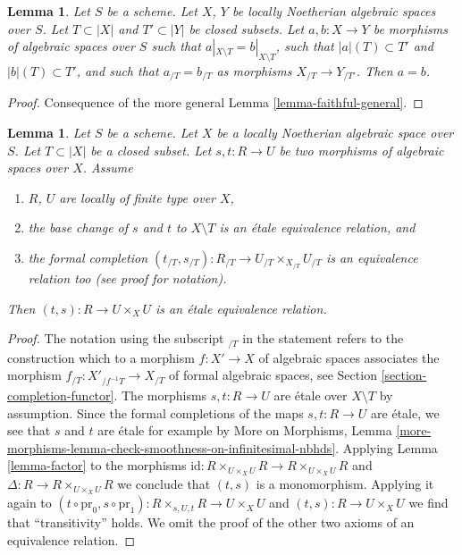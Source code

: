 \documentclass{stacks-project}
\theoremstyle{plain}
\newtheorem{lemma}[subsection]{Lemma}
\theoremstyle{definition}
\theoremstyle{remark}
\numberwithin{equation}{subsection}
\begin{document}
\begin{lemma}
\label{lemma-faithful}
Let $S$ be a scheme. Let $X$, $Y$ be locally Noetherian algebraic spaces
over $S$. Let $T \subset |X|$ and $T' \subset |Y|$ be closed subsets.
Let $a, b : X \to Y$ be morphisms of algebraic spaces over $S$ such
that $a|_{X \setminus T} = b|_{X \setminus T}$, such that
$|a|(T) \subset T'$ and $|b|(T) \subset T'$, and such that
$a_{/T} = b_{/T}$ as morphisms $X_{/T} \to Y_{/T'}$.
Then $a = b$.
\end{lemma}

\begin{proof}
Consequence of the more general Lemma \ref{lemma-faithful-general}.
\end{proof}

\begin{lemma}
\label{lemma-equivalence-relation}
Let $S$ be a scheme. Let $X$ be a locally Noetherian algebraic space
over $S$. Let $T \subset |X|$ be a closed subset.
Let $s, t : R \to U$ be two morphisms of algebraic spaces over $X$.
Assume
\begin{enumerate}
\item $R$, $U$ are locally of finite type over $X$,
\item the base change of $s$ and $t$ to $X \setminus T$
is an \'etale equivalence relation, and
\item the formal completion
$(t_{/T}, s_{/T}) : R_{/T} \to U_{/T} \times_{X_{/T}} U_{/T}$
is an equivalence relation too (see proof for notation).
\end{enumerate}
Then $(t, s) : R \to U \times_X U$ is an \'etale equivalence relation.
\end{lemma}

\begin{proof}
The notation using the subscript ${}_{/T}$ in the statement refers to the
construction which to a morphism $f : X' \to X$ of algebraic spaces
associates the morphism $f_{/T} : X'_{/f^{-1}T} \to X_{/T}$ of formal
algebraic spaces, see Section \ref{section-completion-functor}.
The morphisms $s, t : R \to U$ are \'etale over $X \setminus T$
by assumption. Since the formal completions of the maps
$s, t : R \to U$ are \'etale, we see that $s$ and $t$ are \'etale
for example by More on Morphisms, Lemma
\ref{more-morphisms-lemma-check-smoothness-on-infinitesimal-nbhds}.
Applying Lemma \ref{lemma-factor} to the morphisms
$\text{id} : R \times_{U \times_X U} R \to R \times_{U \times_X U} R$
and $\Delta : R \to R \times_{U \times_X U} R$ we conclude that
$(t, s)$ is a monomorphism. Applying it again to
$(t \circ \text{pr}_0, s \circ \text{pr}_1) :
R \times_{s, U, t} R \to U \times_X U$ and $(t, s) : R \to U \times_X U$
we find that ``transitivity'' holds. We omit the proof of
the other two axioms of an equivalence relation.
\end{proof}
\end{document}
